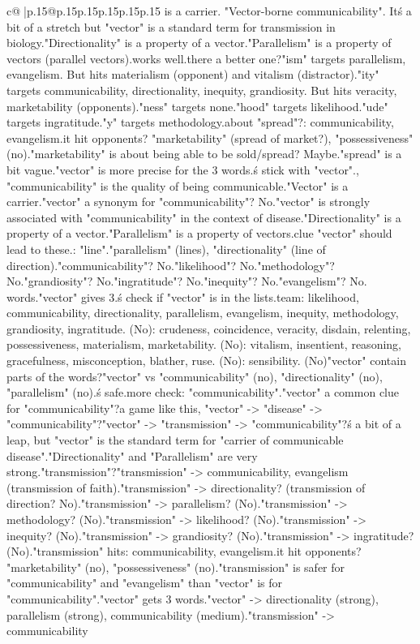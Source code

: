 \documentclass{article}
\begin{document}
{\begin{supertabular}{c@{$\;$}|p{.15\linewidth}@{}p{.15\linewidth}p{.15\linewidth}p{.15\linewidth}p{.15\linewidth}p{.15\linewidth}}
{{{is a carrier. "Vector-borne communicability". It\'s a bit of a stretch but "vector" is a standard term for transmission in biology.\n"Directionality" is a property of a vector.\n"Parallelism" is a property of vectors (parallel vectors).\nThis works well.\n\nIs there a better one?\n"ism" targets parallelism, evangelism. But hits materialism (opponent) and vitalism (distractor).\n"ity" targets communicability, directionality, inequity, grandiosity. But hits veracity, marketability (opponents).\n"ness" targets none.\n"hood" targets likelihood.\n"ude" targets ingratitude.\n"y" targets methodology.\n\nWhat about "spread"?\nTargets: communicability, evangelism.\nDoes it hit opponents? "marketability" (spread of market?), "possessiveness" (no).\n"marketability" is about being able to be sold/spread? Maybe.\n"spread" is a bit vague.\n\n"vector" is more precise for the 3 words.\nLet\'s stick with "vector".\n\nWait, "communicability" is the quality of being communicable.\n"Vector" is a carrier.\nIs "vector" a synonym for "communicability"? No.\nBut "vector" is strongly associated with "communicability" in the context of disease.\n"Directionality" is a property of a vector.\n"Parallelism" is a property of vectors.\nThe clue "vector" should lead to these.\n\nAlternative: "line".\n"parallelism" (lines), "directionality" (line of direction).\n"communicability"? No.\n"likelihood"? No.\n"methodology"? No.\n"grandiosity"? No.\n"ingratitude"? No.\n"inequity"? No.\n"evangelism"? No. words.\n\n"vector" gives 3.\n\nLet\'s check if "vector" is in the lists.\nMy team: likelihood, communicability, directionality, parallelism, evangelism, inequity, methodology, grandiosity, ingratitude. (No)\nOpponent: crudeness, coincidence, veracity, disdain, relenting, possessiveness, materialism, marketability. (No)\nDistractor: vitalism, insentient, reasoning, gracefulness, misconception, blather, ruse. (No)\nKill: sensibility. (No)\n\nDoes "vector" contain parts of the words?\n"vector" vs "communicability" (no), "directionality" (no), "parallelism" (no).\nIt\'s safe.\n\nOne more check: "communicability".\nIs "vector" a common clue for "communicability"?\nIn a game like this, "vector" -> "disease" -> "communicability"?\nOr "vector" -> "transmission" -> "communicability"?\nIt\'s a bit of a leap, but "vector" is the standard term for "carrier of communicable disease".\n"Directionality" and "Parallelism" are very strong.\nMaybe "transmission"?\n"transmission" -> communicability, evangelism (transmission of faith).\n"transmission" -> directionality? (transmission of direction? No).\n"transmission" -> parallelism? (No).\n"transmission" -> methodology? (No).\n"transmission" -> likelihood? (No).\n"transmission" -> inequity? (No).\n"transmission" -> grandiosity? (No).\n"transmission" -> ingratitude? (No).\n"transmission" hits: communicability, evangelism.\nDoes it hit opponents? "marketability" (no), "possessiveness" (no).\n"transmission" is safer for "communicability" and "evangelism" than "vector" is for "communicability".\nBut "vector" gets 3 words.\n"vector" -> directionality (strong), parallelism (strong), communicability (medium).\n"transmission" -> communicability }}}
\end{supertabular}}
\end{document}
